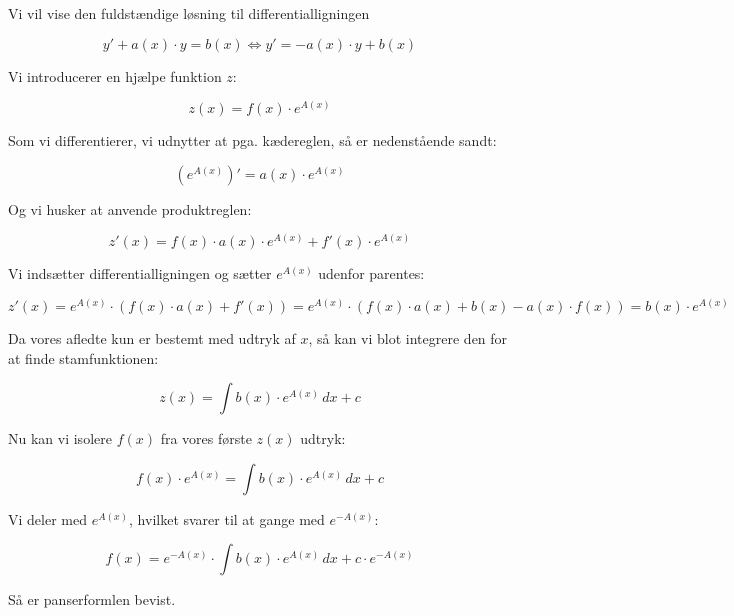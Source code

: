 \documentclass{article}
\makeatletter
\newenvironment{proofw}{\par
  \pushQED{\qed}%
  \normalfont \topsep6\p@\@plus6\p@\relax
  \trivlist
  \item[]\ignorespaces
}{%
  \popQED\endtrivlist\@endpefalse
}
\makeatother
\begin{document}
\begin{proofw}
    
Vi vil vise den fuldstændige løsning til differentialligningen

$$
    y'+a(x)\cdot y=b(x) \Leftrightarrow y'=-a(x) \cdot y + b(x) 
$$

Vi introducerer en hjælpe funktion $z$:

$$
    z(x)=f(x) \cdot e^{A(x)}
$$

Som vi differentierer, vi udnytter at pga. kædereglen,
så er nedenstående sandt:

$$
    \left(e^{A(x)}\right)'=a(x) \cdot e^{A(x)}
$$

Og vi husker at anvende produktreglen:

$$
    z'(x)=f(x) \cdot a(x) \cdot e^{A(x)}+f'(x)\cdot e^{A(x)}
$$

Vi indsætter differentialligningen og sætter $e^{A(x)}$ udenfor parentes:

$$
    z'(x)= e^{A(x)} \cdot (f(x) \cdot a(x) +f'(x))=
    e^{A(x)} \cdot (f(x) \cdot a(x) +b(x)-a(x)\cdot f(x))
    = b(x) \cdot e^{A(x)}
$$

Da vores afledte kun er bestemt med udtryk af $x$,
så kan vi blot integrere den for at finde stamfunktionen:

$$z(x)= \int b(x) \cdot e^{A(x)} \,dx+c$$

Nu kan vi isolere $f(x)$ fra vores første $z(x)$ udtryk:

$$
    f(x) \cdot e^{A(x)}=\int b(x) \cdot e^{A(x)} \,dx+c
$$

Vi deler med $e^{A(x)}$, hvilket svarer til at gange med $e^{-A(x)}$:

$$
    f(x)=e^{-A(x)} \cdot \int b(x) \cdot e^{A(x)} \,dx+c \cdot e^{-A(x)}
$$

Så er panserformlen bevist.

\end{proofw}
\end{document}
